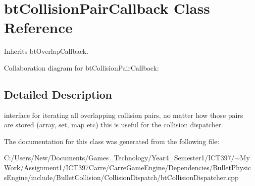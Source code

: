 \hypertarget{classbt_collision_pair_callback}{
\section{btCollisionPairCallback Class Reference}
\label{classbt_collision_pair_callback}
}
Inherits btOverlapCallback.

Collaboration diagram for btCollisionPairCallback:

\subsection{Detailed Description}
interface for iterating all overlapping collision pairs, no matter how those pairs are stored (array, set, map etc) this is useful for the collision dispatcher. 

The documentation for this class was generated from the following file:\begin{CompactItemize}
\item 
C:/Users/New/Documents/Games\_\-Technology/Year4\_\-Semester1/ICT397/$\sim$My Work/Assignment1/ICT397Carre/CarreGameEngine/Dependencies/BulletPhysicsEngine/include/BulletCollision/CollisionDispatch/btCollisionDispatcher.cpp\end{CompactItemize}
